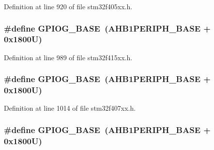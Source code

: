 Definition at line 920 of file stm32f405xx.\+h.

\subsubsection[{\texorpdfstring{G\+P\+I\+O\+G\+\_\+\+B\+A\+SE}{GPIOG_BASE}}]{\setlength{\rightskip}{0pt plus 5cm}\#define G\+P\+I\+O\+G\+\_\+\+B\+A\+SE~({\bf A\+H\+B1\+P\+E\+R\+I\+P\+H\+\_\+\+B\+A\+SE} + 0x1800\+U)}\hypertarget{group___peripheral__registers__structures_ga5d8ca4020f2e8c00bde974e8e7c13cfe}{}\label{group___peripheral__registers__structures_ga5d8ca4020f2e8c00bde974e8e7c13cfe}


Definition at line 989 of file stm32f415xx.\+h.

\subsubsection[{\texorpdfstring{G\+P\+I\+O\+G\+\_\+\+B\+A\+SE}{GPIOG_BASE}}]{\setlength{\rightskip}{0pt plus 5cm}\#define G\+P\+I\+O\+G\+\_\+\+B\+A\+SE~({\bf A\+H\+B1\+P\+E\+R\+I\+P\+H\+\_\+\+B\+A\+SE} + 0x1800\+U)}\hypertarget{group___peripheral__registers__structures_ga5d8ca4020f2e8c00bde974e8e7c13cfe}{}\label{group___peripheral__registers__structures_ga5d8ca4020f2e8c00bde974e8e7c13cfe}


Definition at line 1014 of file stm32f407xx.\+h.

\subsubsection[{\texorpdfstring{G\+P\+I\+O\+G\+\_\+\+B\+A\+SE}{GPIOG_BASE}}]{\setlength{\rightskip}{0pt plus 5cm}\#define G\+P\+I\+O\+G\+\_\+\+B\+A\+SE~({\bf A\+H\+B1\+P\+E\+R\+I\+P\+H\+\_\+\+B\+A\+SE} + 0x1800\+U)}\hypertarget{group___peripheral__registers__structures_ga5d8ca4020f2e8c00bde974e8e7c13cfe}{}\label{group___peripheral__registers__structures_ga5d8ca4020f2e8c00bde974e8e7c13cfe}


